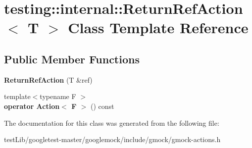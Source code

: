 \hypertarget{classtesting_1_1internal_1_1ReturnRefAction}{}\section{testing\+:\+:internal\+:\+:Return\+Ref\+Action$<$ T $>$ Class Template Reference}
\label{classtesting_1_1internal_1_1ReturnRefAction}
\subsection*{Public Member Functions}
\begin{DoxyCompactItemize}
\item 
\mbox{\label{classtesting_1_1internal_1_1ReturnRefAction_a1384b1cd78f3069f0493e2302f143701}} 
{\bfseries Return\+Ref\+Action} (T \&ref)
\item 
\mbox{\label{classtesting_1_1internal_1_1ReturnRefAction_a48e5d411097707e558af62eb68edc162}} 
{\footnotesize template$<$typename F $>$ }\\{\bfseries operator Action$<$ F $>$} () const
\end{DoxyCompactItemize}


The documentation for this class was generated from the following file\+:\begin{DoxyCompactItemize}
\item 
test\+Lib/googletest-\/master/googlemock/include/gmock/gmock-\/actions.\+h\end{DoxyCompactItemize}
